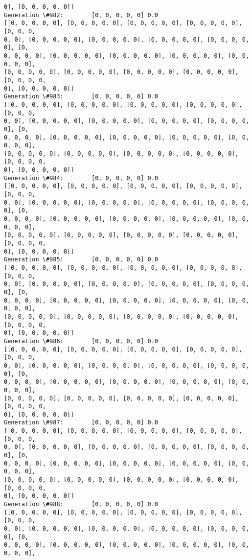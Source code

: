 \documentclass[11pt]{article}
\begin{document}
\begin{Verbatim}[commandchars=\\\{\}]
0], [0, 0, 0, 0, 0]]
Generation \#982:        [0, 0, 0, 0, 0] 0.0
[[0, 0, 0, 0, 0], [0, 0, 0, 0, 0], [0, 0, 0, 0, 0], [0, 0, 0, 0, 0], [0, 0, 0,
0, 0], [0, 0, 0, 0, 0], [0, 0, 0, 0, 0], [0, 0, 0, 0, 0], [0, 0, 0, 0, 0], [0,
0, 0, 0, 0], [0, 0, 0, 0, 0], [0, 0, 0, 0, 0], [0, 0, 0, 0, 0], [0, 0, 0, 0, 0],
[0, 0, 0, 0, 0], [0, 0, 0, 0, 0], [0, 0, 0, 0, 0], [0, 0, 0, 0, 0], [0, 0, 0, 0,
0], [0, 0, 0, 0, 0]]
Generation \#983:        [0, 0, 0, 0, 0] 0.0
[[0, 0, 0, 0, 0], [0, 0, 0, 0, 0], [0, 0, 0, 0, 0], [0, 0, 0, 0, 0], [0, 0, 0,
0, 0], [0, 0, 0, 0, 0], [0, 0, 0, 0, 0], [0, 0, 0, 0, 0], [0, 0, 0, 0, 0], [0,
0, 0, 0, 0], [0, 0, 0, 0, 0], [0, 0, 0, 0, 0], [0, 0, 0, 0, 0], [0, 0, 0, 0, 0],
[0, 0, 0, 0, 0], [0, 0, 0, 0, 0], [0, 0, 0, 0, 0], [0, 0, 0, 0, 0], [0, 0, 0, 0,
0], [0, 0, 0, 0, 0]]
Generation \#984:        [0, 0, 0, 0, 0] 0.0
[[0, 0, 0, 0, 0], [0, 0, 0, 0, 0], [0, 0, 0, 0, 0], [0, 0, 0, 0, 0], [0, 0, 0,
0, 0], [0, 0, 0, 0, 0], [0, 0, 0, 0, 0], [0, 0, 0, 0, 0], [0, 0, 0, 0, 0], [0,
0, 0, 0, 0], [0, 0, 0, 0, 0], [0, 0, 0, 0, 0], [0, 0, 0, 0, 0], [0, 0, 0, 0, 0],
[0, 0, 0, 0, 0], [0, 0, 0, 0, 0], [0, 0, 0, 0, 0], [0, 0, 0, 0, 0], [0, 0, 0, 0,
0], [0, 0, 0, 0, 0]]
Generation \#985:        [0, 0, 0, 0, 0] 0.0
[[0, 0, 0, 0, 0], [0, 0, 0, 0, 0], [0, 0, 0, 0, 0], [0, 0, 0, 0, 0], [0, 0, 0,
0, 0], [0, 0, 0, 0, 0], [0, 0, 0, 0, 0], [0, 0, 0, 0, 0], [0, 0, 0, 0, 0], [0,
0, 0, 0, 0], [0, 0, 0, 0, 0], [0, 0, 0, 0, 0], [0, 0, 0, 0, 0], [0, 0, 0, 0, 0],
[0, 0, 0, 0, 0], [0, 0, 0, 0, 0], [0, 0, 0, 0, 0], [0, 0, 0, 0, 0], [0, 0, 0, 0,
0], [0, 0, 0, 0, 0]]
Generation \#986:        [0, 0, 0, 0, 0] 0.0
[[0, 0, 0, 0, 0], [0, 0, 0, 0, 0], [0, 0, 0, 0, 0], [0, 0, 0, 0, 0], [0, 0, 0,
0, 0], [0, 0, 0, 0, 0], [0, 0, 0, 0, 0], [0, 0, 0, 0, 0], [0, 0, 0, 0, 0], [0,
0, 0, 0, 0], [0, 0, 0, 0, 0], [0, 0, 0, 0, 0], [0, 0, 0, 0, 0], [0, 0, 0, 0, 0],
[0, 0, 0, 0, 0], [0, 0, 0, 0, 0], [0, 0, 0, 0, 0], [0, 0, 0, 0, 0], [0, 0, 0, 0,
0], [0, 0, 0, 0, 0]]
Generation \#987:        [0, 0, 0, 0, 0] 0.0
[[0, 0, 0, 0, 0], [0, 0, 0, 0, 0], [0, 0, 0, 0, 0], [0, 0, 0, 0, 0], [0, 0, 0,
0, 0], [0, 0, 0, 0, 0], [0, 0, 0, 0, 0], [0, 0, 0, 0, 0], [0, 0, 0, 0, 0], [0,
0, 0, 0, 0], [0, 0, 0, 0, 0], [0, 0, 0, 0, 0], [0, 0, 0, 0, 0], [0, 0, 0, 0, 0],
[0, 0, 0, 0, 0], [0, 0, 0, 0, 0], [0, 0, 0, 0, 0], [0, 0, 0, 0, 0], [0, 0, 0, 0,
0], [0, 0, 0, 0, 0]]
Generation \#988:        [0, 0, 0, 0, 0] 0.0
[[0, 0, 0, 0, 0], [0, 0, 0, 0, 0], [0, 0, 0, 0, 0], [0, 0, 0, 0, 0], [0, 0, 0,
0, 0], [0, 0, 0, 0, 0], [0, 0, 0, 0, 0], [0, 0, 0, 0, 0], [0, 0, 0, 0, 0], [0,
0, 0, 0, 0], [0, 0, 0, 0, 0], [0, 0, 0, 0, 0], [0, 0, 0, 0, 0], [0, 0, 0, 0, 0],

\end{Verbatim}
\end{document}
